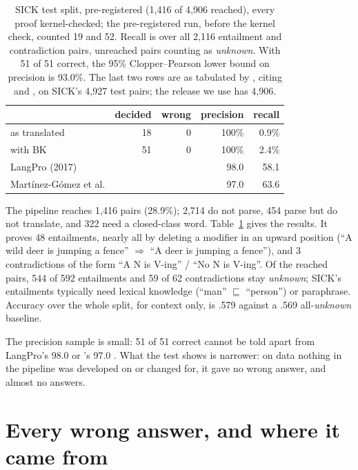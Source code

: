 \documentclass[11pt]{article}
\newcommand{\unk}{\textit{unknown}}
\begin{document}
\begin{table}[t]
\centering\small
\setlength{\tabcolsep}{3.5pt}
\begin{tabular}{lrrrr}
\toprule
& decided & wrong & precision & recall \\
\midrule
as translated & 18 & 0 & 100\% & 0.9\% \\
with BK & 51 & 0 & 100\% & 2.4\% \\
\midrule
LangPro (2017) & & & 98.0 & 58.1 \\
Mart\'inez-G\'omez et al. & & & 97.0 & 63.6 \\
\bottomrule
\end{tabular}
\caption{SICK test split, pre-registered (1,416 of 4,906 reached),
every proof kernel-checked; the pre-registered run, before the kernel
check, counted 19 and 52. Recall is over all 2,116 entailment and
contradiction pairs, unreached pairs counting as \unk{}. With 51 of 51
correct, the 95\% Clopper--Pearson lower bound on precision is 93.0\%. The last two rows
are as tabulated by \citet[Table 3]{chen-etal-2021-neurallog}, citing
\citet{abzianidze-2017-langpro} and
\citet{martinez-gomez-etal-2017-demand}, on SICK's 4,927 test pairs; the
release we use has 4,906.}
\label{tab:sick}
\end{table}

The pipeline reaches 1,416 pairs (28.9\%); 2,714 do not parse, 454
parse but do not translate, and 322 need a closed-class word.
Table~\ref{tab:sick} gives the results. It proves 48 entailments, nearly
all by deleting a modifier in an upward position (``A wild deer is
jumping a fence'' $\Rightarrow$ ``A deer is jumping a fence''), and 3
contradictions of the form ``A N is V-ing'' / ``No N is V-ing''. Of the
reached pairs, 544 of 592 entailments and 59 of 62 contradictions stay
\unk{}; SICK's entailments typically need lexical knowledge (``man''
$\sqsubseteq$ ``person'') or paraphrase. Accuracy over the whole split,
for context only, is .579 against a .569 all-\unk{} baseline.

The precision sample is small: 51 of 51 correct
cannot be told apart from LangPro's 98.0 or
\citeauthor{martinez-gomez-etal-2017-demand}'s 97.0
\citep{clopper-pearson-1934}. What the test shows is narrower: on data
nothing in the pipeline was developed on or changed for, it gave no
wrong answer, and almost no answers.

\section{Every wrong answer, and where it came from}
\label{sec:ledger}
\end{document}
